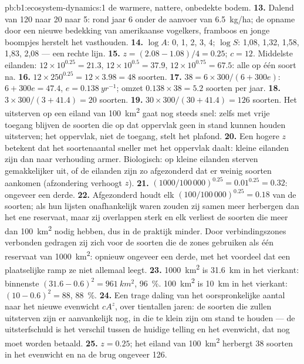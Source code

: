 \begin{solution}{pb:b1:ecosystem-dynamics:1}
de warmere, nattere, onbedekte bodem.
\textbf{13.} Dalend van \num{120} naar \num{20} naar \num{5}: rond jaar 6
onder de aanvoer van \qty{6.5}{kg/ha}; de opname door een nieuwe bedekking
van amerikaanse vogelkers, framboos en jonge boompjes herstelt het
vasthouden.
\textbf{14.} $\log A$: 0, 1, 2, 3, 4; $\log S$: 1,08, 1,32, 1,58,
1,83, 2,08 --- een rechte lijn.
\textbf{15.} $z = (2.08 - 1.08)/4 = 0.25$; $c = 12$. Middelste eilanden:
$12\times 10^{0.25} = 21.3$, $12\times 10^{0.5} = 37.9$, $12\times
10^{0.75} = 67.5$: alle op één soort na.
\textbf{16.} $12\times 250^{0.25} = 12\times 3.98 = 48$ soorten.
\textbf{17.} $38 = 6\times 300/(6 + 300e)$: $6 + 300e = 47.4$, $e =
\qty{0.138}{yr^{-1}}$; omzet $0.138\times 38 = 5.2$ soorten per jaar.
\textbf{18.} $3\times 300/(3 + 41.4) = 20$ soorten.
\textbf{19.} $30\times 300/(30 + 41.4) = 126$ soorten. Het uitsterven op een
eiland van \qty{100}{km^2} gaat nog steeds snel: zelfs met vrije toegang
blijven de soorten die op dat oppervlak geen  in stand kunnen
houden uitsterven; het oppervlak, niet de toegang, stelt het plafond.
\textbf{20.} Een hogere $z$ betekent dat het soortenaantal sneller met het
oppervlak daalt: kleine eilanden zijn dan naar verhouding armer. Biologisch:
 op kleine eilanden sterven gemakkelijker uit, of de eilanden zijn
zo afgezonderd dat er weinig soorten aankomen (afzondering verhoogt $z$).
\textbf{21.} $(1000/100\,000)^{0.25} = 0.01^{0.25} = 0.32$: ongeveer een
derde.
\textbf{22.} Afgezonderd houdt elk $(100/100\,000)^{0.25} = 0.18$ van de
soorten; als hun lijsten onafhankelijk waren zouden zij samen meer herbergen
dan het ene reservaat, maar zij overlappen sterk en elk verliest de soorten
die meer dan \qty{100}{km^2} nodig hebben, dus in de praktijk minder. Door
verbindingszones verbonden gedragen zij zich voor de soorten die de zones
gebruiken als één reservaat van \qty{1000}{km^2}: opnieuw ongeveer een derde,
met het voordeel dat een plaatselijke ramp ze niet allemaal leegt.
\textbf{23.} \qty{1000}{km^2} is \qty{31.6}{km} in het vierkant: binnenste
$(31.6 - 0.6)^2 = \qty{961}{km^2}$, \qty{96}{\%}. \qty{100}{km^2} is
\qty{10}{km} in het vierkant: $(10 - 0.6)^2 = 88$, \qty{88}{\%}.
\textbf{24.} Een trage daling van het oorspronkelijke aantal naar het nieuwe
evenwicht $cA^z$, over tientallen jaren: de soorten die zullen uitsterven
zijn er aanvankelijk nog, in  die te klein zijn om stand te houden
--- de uitsterfschuld is het verschil tussen de huidige telling en het
evenwicht, dat nog moet worden betaald.
\textbf{25.} $z = 0.25$; het eiland van \qty{100}{km^2} herbergt \num{38}
soorten in het evenwicht en na de brug ongeveer \num{126}.
\end{solution}
